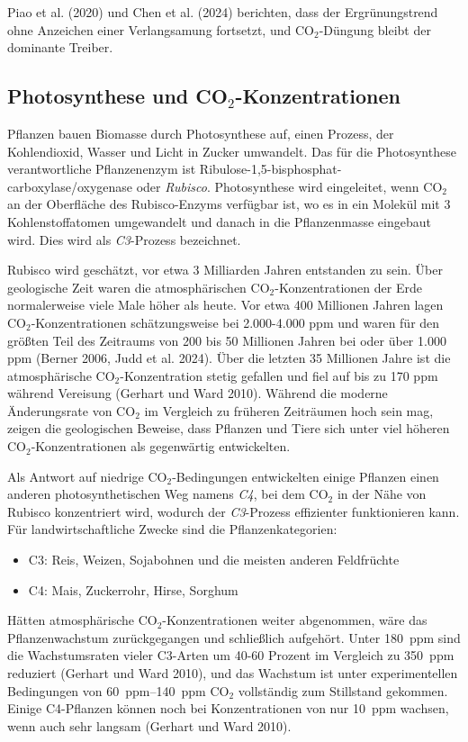\documentclass[12pt,paper=a4,DIV=12,parskip=never,chapterprefix=false,headings=standardclasses]{scrreprt}
\numberwithin{figure}{chapter}
\begin{document}
Piao et al. (2020) und Chen et al. (2024) berichten, dass der Ergrünungstrend ohne Anzeichen einer Verlangsamung fortsetzt, und CO$_2$-Düngung bleibt der dominante Treiber.

\subsection{Photosynthese und CO$_2$-Konzentrationen}

Pflanzen bauen Biomasse durch Photosynthese auf, einen Prozess, der Kohlendioxid, Wasser und Licht in Zucker umwandelt. Das für die Photosynthese verantwortliche Pflanzenenzym ist Ribulose-1,5-bisphosphat-carboxylase/oxygenase oder \emph{Rubisco}. Photosynthese wird eingeleitet, wenn CO$_2$ an der Oberfläche des Rubisco-Enzyms verfügbar ist, wo es in ein Molekül mit 3 Kohlenstoffatomen umgewandelt und danach in die Pflanzenmasse eingebaut wird. Dies wird als \emph{C3}-Prozess bezeichnet.

Rubisco wird geschätzt, vor etwa 3 Milliarden Jahren entstanden zu sein. Über geologische Zeit waren die atmosphärischen CO$_2$-Konzentrationen der Erde normalerweise viele Male höher als heute. Vor etwa 400 Millionen Jahren lagen CO$_2$-Konzentrationen schätzungsweise bei 2.000-4.000 ppm und waren für den größten Teil des Zeitraums von 200 bis 50 Millionen Jahren bei oder über 1.000 ppm (Berner 2006, Judd et al. 2024). Über die letzten 35 Millionen Jahre ist die atmosphärische CO$_2$-Konzentration stetig gefallen und fiel auf bis zu 170 ppm während Vereisung (Gerhart und Ward 2010). Während die moderne Änderungsrate von CO$_2$ im Vergleich zu früheren Zeiträumen hoch sein mag, zeigen die geologischen Beweise, dass Pflanzen und Tiere sich unter viel höheren CO$_2$-Konzentrationen als gegenwärtig entwickelten.

Als Antwort auf niedrige CO$_2$-Bedingungen entwickelten einige Pflanzen einen anderen photosynthetischen Weg namens \emph{C4}, bei dem CO$_2$ in der Nähe von Rubisco konzentriert wird, wodurch der \emph{C3}-Prozess effizienter funktionieren kann. Für landwirtschaftliche Zwecke sind die Pflanzenkategorien:
\begin{itemize}
\item C3: Reis, Weizen, Sojabohnen und die meisten anderen Feldfrüchte
\item C4: Mais, Zuckerrohr, Hirse, Sorghum	
\end{itemize}

Hätten atmosphärische CO$_2$-Konzentrationen weiter abgenommen, wäre das Pflanzenwachstum zurückgegangen und schließlich aufgehört. Unter \SI{180}{ppm} sind die Wachstumsraten vieler C3-Arten um 40-60 Prozent im Vergleich zu \SI{350}{ppm} reduziert (Gerhart und Ward 2010), und das Wachstum ist unter experimentellen Bedingungen von \SIrange{60}{140}{ppm} CO$_2$ vollständig zum Stillstand gekommen. Einige C4-Pflanzen können noch bei Konzentrationen von nur \SI{10}{ppm} wachsen, wenn auch sehr langsam (Gerhart und Ward 2010).
\end{document}
